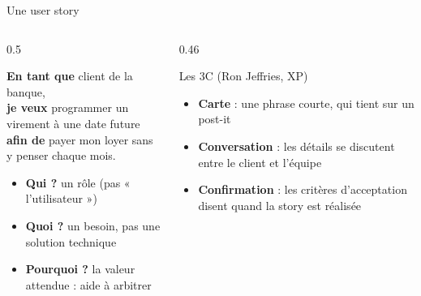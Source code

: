 \documentclass[aspectratio=169,10pt]{beamer}
\begin{document}
\begin{frame}{Une user story}
  \begin{columns}[c]
    \begin{column}{0.5\textwidth}
      \begin{datacard}
        \raggedright
        \textbf{\color{qaaccent}En tant que} client de la banque,\\
        \textbf{\color{qaaccent}je veux} programmer un virement à une date future\\
        \textbf{\color{qaaccent}afin de} payer mon loyer sans y penser chaque mois.
      \end{datacard}
      \vspace{2mm}
      \begin{itemize}
        \item \textbf{Qui ?} un rôle (pas « l'utilisateur »)
        \item \textbf{Quoi ?} un besoin, pas une solution technique
        \item \textbf{Pourquoi ?} la valeur attendue : aide à arbitrer
      \end{itemize}
    \end{column}
    \begin{column}{0.46\textwidth}
      \begin{block}{Les 3C (Ron Jeffries, XP)}
        \begin{itemize}
          \item \textbf{Carte} : une phrase courte, qui tient sur un post-it
          \item \textbf{Conversation} : les détails se discutent entre le client et l'équipe
          \item \textbf{Confirmation} : les \alert{critères d'acceptation} disent quand la story est réalisée
        \end{itemize}
      \end{block}
    \end{column}
  \end{columns}
\end{frame}
\end{document}
